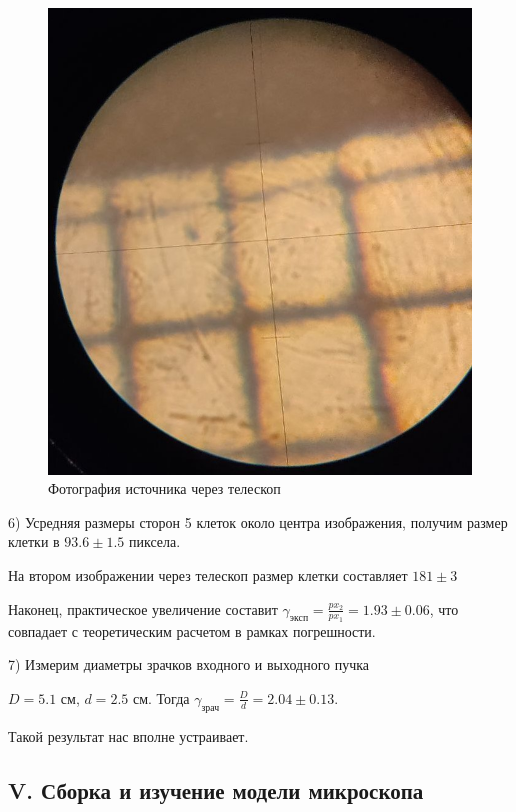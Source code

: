 \documentclass{astroedu-lab}
\begin{document}
\begin{problem}
\begin{figure}[H]
    \centering
    \includegraphics[scale=0.35]{3.jpg}
    \caption{Фотография источника через телескоп}
\end{figure}

6) Усредняя размеры сторон 5 клеток около центра изображения, получим размер клетки в $93.6 \pm 1.5$ пиксела.

На втором изображении через телескоп размер клетки составляет $181 \pm 3$

Наконец, практическое увеличение составит $\gamma_{\text{эксп}} = \frac{px_2}{px_1} = 1.93 \pm 0.06$, что совпадает с теоретическим расчетом в рамках погрешности.

7) Измерим диаметры зрачков входного и выходного пучка

$D = 5.1$ см, $d = 2.5$ см. Тогда $\gamma_{\text{зрач}} = \frac{D}{d} = 2.04 \pm 0.13$.

Такой результат нас вполне устраивает.

\subsection{V. Сборка и изучение модели микроскопа}


\end{problem}
\end{document}
